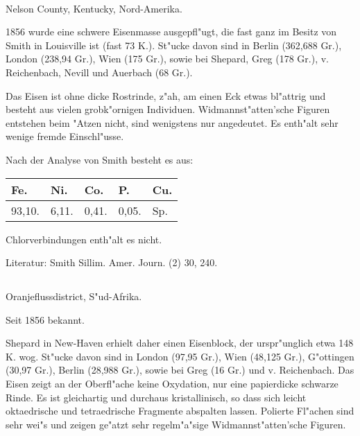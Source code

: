 \documentclass[a4paper, 11pt, oneside]{article}
\begin{document}
\paragraph{}
Nelson County, Kentucky, Nord-Amerika.

1856 wurde eine schwere Eisenmasse ausgepfl"ugt, die fast ganz im Besitz von Smith in Louisville ist (fast 73 K.). St"ucke davon sind in Berlin (362,688 Gr.), London (238,94 Gr.), Wien (175 Gr.), sowie bei Shepard, Greg (178 Gr.), v. Reichenbach, Nevill und Auerbach (68 Gr.).

Das Eisen ist ohne dicke Rostrinde, z"ah, am einen Eck etwas bl"attrig und besteht aus vielen grobk"ornigen Individuen. Widmannst"atten'sche Figuren entstehen beim "Atzen nicht, sind wenigstens nur angedeutet. Es enth"alt sehr wenige fremde Einschl"usse.

Nach der Analyse von Smith besteht es aus:
\begin{table}[H]
    \centering\swabfamily\Large
    \begin{tabular}{l l l l l}
        Fe. & Ni. & Co. & P. & Cu. \\ \hline
        93,10. & 6,11. & 0,41. & 0,05. & Sp. \\
    \end{tabular}
\end{table}

Chlorverbindungen enth"alt es nicht.

\normalsize
Literatur: Smith Sillim. Amer. Journ. (2) 30, 240.

\subsection{}
\LARGE
\paragraph{}
Oranjeflussdistrict, S"ud-Afrika.

Seit 1856 bekannt.

Shepard in New-Haven erhielt daher einen Eisenblock, der urspr"unglich etwa 148 K. wog. St"ucke davon sind in London (97,95 Gr.), Wien (48,125 Gr.), G"ottingen (30,97 Gr.), Berlin (28,988 Gr.), sowie bei Greg (16 Gr.) und v. Reichenbach. Das Eisen zeigt an der Oberfl"ache keine Oxydation, nur eine papierdicke schwarze Rinde. Es ist gleichartig und durchaus kristallinisch, so dass sich leicht oktaedrische und tetraedrische Fragmente abspalten lassen. Polierte Fl"achen sind sehr wei"s und zeigen ge"atzt sehr regelm"a"sige Widmannst"atten'sche Figuren.
\end{document}

